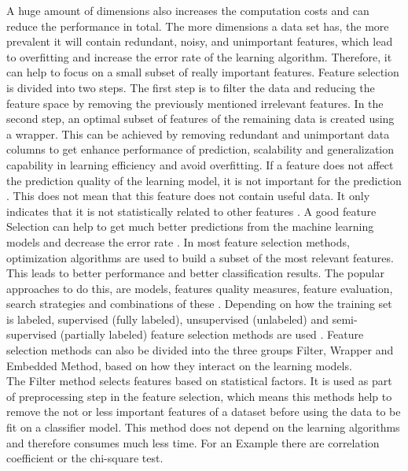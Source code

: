 \documentclass[../masterarbeit.tex]{subfiles}
\begin{document}
A huge amount of dimensions also increases the computation costs and can reduce the performance in total. The more dimensions a data set has, the more prevalent it will contain redundant, noisy, and unimportant features, which lead to overfitting and increase the error rate of the learning algorithm. Therefore, it can help to focus on a small subset of really important features. \autocite[]{CAI201870} \textcite[]{ALLAM2022329} \textcite[]{VenkateshAnuradha:2019} 
Feature selection is divided into two steps. The first step is to filter the data and reducing the feature space by removing the previously mentioned irrelevant features. In the second step, an optimal subset of features of the remaining data is created using a wrapper. \autocite[]{CAI201870}
This can be achieved by removing redundant and unimportant data columns to get enhance performance of prediction,  scalability  and  generalization  capability in learning efficiency and avoid overfitting. If a feature does not affect the prediction quality of the learning model, it is not important for the prediction \textcite[]{VenkateshAnuradha:2019}. This does not mean that this feature does not contain useful data. It only indicates that it is not statistically related to other features \textcite[]{VenkateshAnuradha:2019}.
 A good feature Selection can help to get much better predictions from the machine learning models and decrease the error rate \textcite[]{CAI201870}. 
In most feature selection methods, optimization algorithms are used to build a subset of the most relevant features. This leads to better performance and better classification results. \autocite[]{ALLAM2022329}
The popular approaches to do this, are models, features quality measures, feature evaluation, search strategies and combinations of these \textcite[]{VenkateshAnuradha:2019}.
Depending on how the training set is labeled, supervised (fully labeled), unsupervised (unlabeled) and semi-supervised (partially labeled) feature selection methods are used \textcite[]{CAI201870}.
Feature selection methods can also be divided into the three groups Filter, Wrapper and Embedded Method, based on how they interact on the learning models. \\
 The Filter method selects features based on statistical factors. It is used as part of preprocessing step in the feature selection, which means this methods help to remove the not or less important features of a dataset before using the data to be fit on a classifier model. This method does not depend on the learning algorithms and therefore consumes much less time. For an Example there are correlation  coefficient or the chi-square test. \autocite[]{VenkateshAnuradha:2019} \textcite[]{CAI201870} \textcite[]{PISNER2020101} \\~\\
\end{document}
